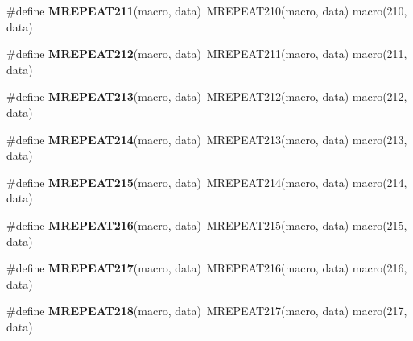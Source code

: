 \begin{DoxyCompactItemize}
\item 
\hypertarget{group__group__xmega__utils__mrepeat_ga9b4e3f709d79be3abf426a6f35373a9f}{\#define {\bfseries M\-R\-E\-P\-E\-A\-T211}(macro, data)~M\-R\-E\-P\-E\-A\-T210(macro, data)   macro(210, data)}\label{group__group__xmega__utils__mrepeat_ga9b4e3f709d79be3abf426a6f35373a9f}

\item 
\hypertarget{group__group__xmega__utils__mrepeat_gad82f46aaf9a5b824c91394754824d66d}{\#define {\bfseries M\-R\-E\-P\-E\-A\-T212}(macro, data)~M\-R\-E\-P\-E\-A\-T211(macro, data)   macro(211, data)}\label{group__group__xmega__utils__mrepeat_gad82f46aaf9a5b824c91394754824d66d}

\item 
\hypertarget{group__group__xmega__utils__mrepeat_gaccb21a4853dfcaf0709211bfb7bd8671}{\#define {\bfseries M\-R\-E\-P\-E\-A\-T213}(macro, data)~M\-R\-E\-P\-E\-A\-T212(macro, data)   macro(212, data)}\label{group__group__xmega__utils__mrepeat_gaccb21a4853dfcaf0709211bfb7bd8671}

\item 
\hypertarget{group__group__xmega__utils__mrepeat_ga7dc8e4f802d149970b11ab09ee582aca}{\#define {\bfseries M\-R\-E\-P\-E\-A\-T214}(macro, data)~M\-R\-E\-P\-E\-A\-T213(macro, data)   macro(213, data)}\label{group__group__xmega__utils__mrepeat_ga7dc8e4f802d149970b11ab09ee582aca}

\item 
\hypertarget{group__group__xmega__utils__mrepeat_gae2a73793b6f0682b5b209181a2cce5c3}{\#define {\bfseries M\-R\-E\-P\-E\-A\-T215}(macro, data)~M\-R\-E\-P\-E\-A\-T214(macro, data)   macro(214, data)}\label{group__group__xmega__utils__mrepeat_gae2a73793b6f0682b5b209181a2cce5c3}

\item 
\hypertarget{group__group__xmega__utils__mrepeat_gab9f89f1489a59ce0b2fdaf9c5a1eb04b}{\#define {\bfseries M\-R\-E\-P\-E\-A\-T216}(macro, data)~M\-R\-E\-P\-E\-A\-T215(macro, data)   macro(215, data)}\label{group__group__xmega__utils__mrepeat_gab9f89f1489a59ce0b2fdaf9c5a1eb04b}

\item 
\hypertarget{group__group__xmega__utils__mrepeat_gac3e3763cfaa790bd77c54a125a5342ba}{\#define {\bfseries M\-R\-E\-P\-E\-A\-T217}(macro, data)~M\-R\-E\-P\-E\-A\-T216(macro, data)   macro(216, data)}\label{group__group__xmega__utils__mrepeat_gac3e3763cfaa790bd77c54a125a5342ba}

\item 
\hypertarget{group__group__xmega__utils__mrepeat_ga35dba4e312bc00bcfcbf099981b01206}{\#define {\bfseries M\-R\-E\-P\-E\-A\-T218}(macro, data)~M\-R\-E\-P\-E\-A\-T217(macro, data)   macro(217, data)}\label{group__group__xmega__utils__mrepeat_ga35dba4e312bc00bcfcbf099981b01206}


\end{DoxyCompactItemize}
